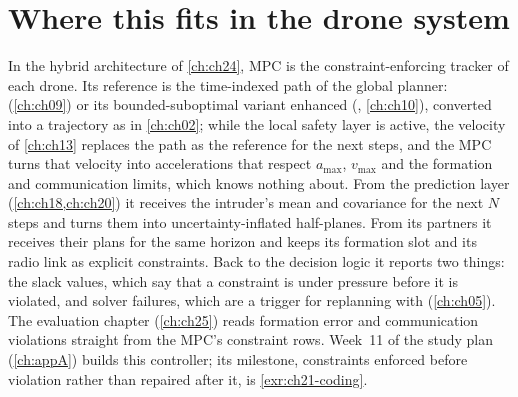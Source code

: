 \section{Where this fits in the drone system}
\label{sec:ch21-drone}

\begin{dronebox}
In the hybrid architecture of \cref{ch:ch24}, MPC is the constraint-enforcing
tracker of each drone. Its reference is the time-indexed path of the global
planner: \cbs (\cref{ch:ch09}) or its bounded-suboptimal variant enhanced
\cbs (\ecbs, \cref{ch:ch10}), converted into a trajectory as
in \cref{ch:ch02}; while the local safety layer is active, the \orca velocity
of \cref{ch:ch13} replaces the path as the reference for the next steps, and
the MPC turns that velocity into accelerations that respect $a_{\max}$,
$v_{\max}$ and the formation and communication limits, which \orca knows
nothing about. From the prediction layer (\cref{ch:ch18,ch:ch20}) it receives
the intruder's mean and covariance for the next $N$ steps and turns them into
uncertainty-inflated half-planes. From its partners it receives their plans
for the same horizon and keeps its formation slot and its radio link as
explicit constraints. Back to the decision logic it reports two things: the
slack values, which say that a constraint is under pressure before it is
violated, and solver failures, which are a trigger for replanning with
\dstarlite (\cref{ch:ch05}). The evaluation chapter (\cref{ch:ch25}) reads
formation error and communication violations straight from the MPC's
constraint rows. Week~11 of the study plan (\cref{ch:appA}) builds this
controller; its milestone, constraints enforced before violation rather than
repaired after it, is \cref{exr:ch21-coding}.
\end{dronebox}

